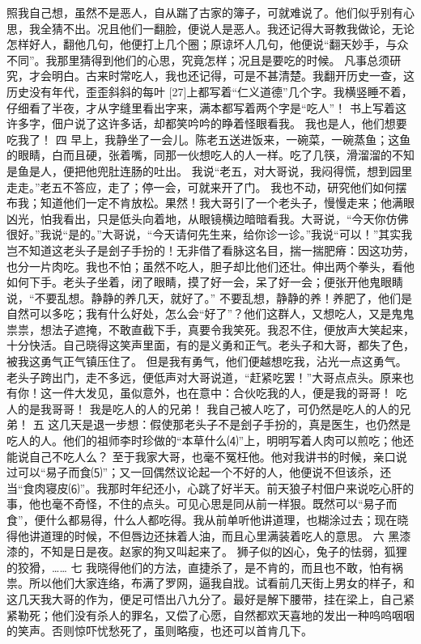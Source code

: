 \documentclass[12pt,UTF8]{ctexbook}
\begin{document}
照我自己想，虽然不是恶人，自从踹了古家的簿子，可就难说了。他们似乎别有心思，我全猜不出。况且他们一翻脸，便说人是恶人。我还记得大哥教我做论，无论怎样好人，翻他几句，他便打上几个圈；原谅坏人几句，他便说“翻天妙手，与众不同”。我那里猜得到他们的心思，究竟怎样；况且是要吃的时候。
凡事总须研究，才会明白。古来时常吃人，我也还记得，可是不甚清楚。我翻开历史一查，这历史没有年代，歪歪斜斜的每叶 [27]上都写着“仁义道德”几个字。我横竖睡不着，仔细看了半夜，才从字缝里看出字来，满本都写着两个字是“吃人”！
书上写着这许多字，佃户说了这许多话，却都笑吟吟的睁着怪眼看我。
我也是人，他们想要吃我了！
四
早上，我静坐了一会儿。陈老五送进饭来，一碗菜，一碗蒸鱼；这鱼的眼睛，白而且硬，张着嘴，同那一伙想吃人的人一样。吃了几筷，滑溜溜的不知是鱼是人，便把他兜肚连肠的吐出。
我说“老五，对大哥说，我闷得慌，想到园里走走。”老五不答应，走了；停一会，可就来开了门。
我也不动，研究他们如何摆布我；知道他们一定不肯放松。果然！我大哥引了一个老头子，慢慢走来；他满眼凶光，怕我看出，只是低头向着地，从眼镜横边暗暗看我。大哥说，“今天你仿佛很好。”我说“是的。”大哥说，“今天请何先生来，给你诊一诊。”我说“可以！”其实我岂不知道这老头子是刽子手扮的！无非借了看脉这名目，揣一揣肥瘠：因这功劳，也分一片肉吃。我也不怕；虽然不吃人，胆子却比他们还壮。伸出两个拳头，看他如何下手。老头子坐着，闭了眼睛，摸了好一会，呆了好一会；便张开他鬼眼睛说，“不要乱想。静静的养几天，就好了。”
不要乱想，静静的养！养肥了，他们是自然可以多吃；我有什么好处，怎么会“好了”？他们这群人，又想吃人，又是鬼鬼祟祟，想法子遮掩，不敢直截下手，真要令我笑死。我忍不住，便放声大笑起来，十分快活。自己晓得这笑声里面，有的是义勇和正气。老头子和大哥，都失了色，被我这勇气正气镇压住了。
但是我有勇气，他们便越想吃我，沾光一点这勇气。老头子跨出门，走不多远，便低声对大哥说道，“赶紧吃罢！”大哥点点头。原来也有你！这一件大发见，虽似意外，也在意中：合伙吃我的人，便是我的哥哥！
吃人的是我哥哥！
我是吃人的人的兄弟！
我自己被人吃了，可仍然是吃人的人的兄弟！
五
这几天是退一步想：假使那老头子不是刽子手扮的，真是医生，也仍然是吃人的人。他们的祖师李时珍做的“本草什么⑷”上，明明写着人肉可以煎吃；他还能说自己不吃人么？
至于我家大哥，也毫不冤枉他。他对我讲书的时候，亲口说过可以“易子而食⑸”；又一回偶然议论起一个不好的人，他便说不但该杀，还当“食肉寝皮⑹”。我那时年纪还小，心跳了好半天。前天狼子村佃户来说吃心肝的事，他也毫不奇怪，不住的点头。可见心思是同从前一样狠。既然可以“易子而食”，便什么都易得，什么人都吃得。我从前单听他讲道理，也糊涂过去；现在晓得他讲道理的时候，不但唇边还抹着人油，而且心里满装着吃人的意思。
六
黑漆漆的，不知是日是夜。赵家的狗又叫起来了。
狮子似的凶心，兔子的怯弱，狐狸的狡猾，……
七
我晓得他们的方法，直捷杀了，是不肯的，而且也不敢，怕有祸祟。所以他们大家连络，布满了罗网，逼我自戕。试看前几天街上男女的样子，和这几天我大哥的作为，便足可悟出八九分了。最好是解下腰带，挂在梁上，自己紧紧勒死；他们没有杀人的罪名，又偿了心愿，自然都欢天喜地的发出一种呜呜咽咽的笑声。否则惊吓忧愁死了，虽则略瘦，也还可以首肯几下。
\end{document}

